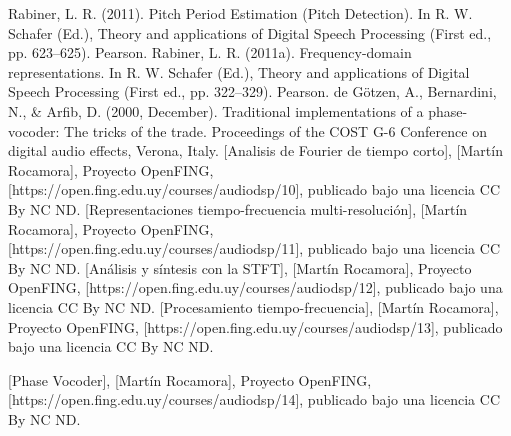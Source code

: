 \documentclass[a4paper]{article}
\begin{document}
\newpage
\begin{thebibliography}{100} %
\addtolength{\leftmargin}{0.2in} %
\setlength{\itemindent}{-0.2in}
Rabiner, L. R. (2011). Pitch Period Estimation (Pitch Detection). In R. W. Schafer (Ed.), Theory and applications of Digital Speech Processing (First ed., pp. 623–625). Pearson.
 Rabiner, L. R. (2011a). Frequency-domain representations. In R. W. Schafer (Ed.), Theory and applications of Digital Speech Processing (First ed., pp. 322–329). Pearson.
 de Götzen, A., Bernardini, N., & Arfib, D. (2000, December). Traditional implementations of a phase-vocoder: The tricks of the trade. Proceedings of the COST G-6 Conference on digital audio effects, Verona, Italy.
 [Analisis de Fourier de tiempo corto], [Martín Rocamora], Proyecto OpenFING, [https://open.fing.edu.uy/courses/audiodsp/10], publicado bajo una licencia CC By NC ND.
[Representaciones tiempo-frecuencia multi-resolución], [Martín Rocamora], Proyecto OpenFING, [https://open.fing.edu.uy/courses/audiodsp/11], publicado bajo una licencia CC By NC ND.
[Análisis y síntesis con la STFT], [Martín Rocamora], Proyecto OpenFING, [https://open.fing.edu.uy/courses/audiodsp/12], publicado bajo una licencia CC By NC ND.
[Procesamiento tiempo-frecuencia], [Martín Rocamora], Proyecto OpenFING, [https://open.fing.edu.uy/courses/audiodsp/13], publicado bajo una licencia CC By NC ND.

[Phase Vocoder], [Martín Rocamora], Proyecto OpenFING, [https://open.fing.edu.uy/courses/audiodsp/14], publicado bajo una licencia CC By NC ND.
\end{thebibliography}
\end{document}
